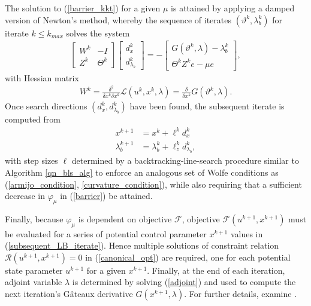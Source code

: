 The solution to (\ref{barrier_kkt}) for a given $\mu$ is attained by applying a damped version of  Newton's method, whereby the sequence of iterates $(\vartheta^k, \lambda_b^k)$ for iterate $k \leq k_{max}$ solves the system
\begin{align}
  \begin{bmatrix}
   W^k   & - I \\
   Z^k   &   \varTheta^k
  \end{bmatrix}
  \begin{bmatrix}
    d_{x}^k \\
    d_{\lambda_b}^k
  \end{bmatrix} = - 
  \begin{bmatrix}
    G(\vartheta^k,\lambda) - \lambda_b^k \\
    \varTheta^k Z^k e - \mu e
  \end{bmatrix},
\end{align}
with Hessian matrix 
\begin{align}
  W^k = \frac{\delta^2}{\delta x^k \delta x^k} \mathscr{L}(u^k, x^k, \lambda) = \frac{\delta}{\delta x^k} G(\vartheta^k,\lambda).
\end{align}
Once search directions $(d_{x}^k, d_{\lambda_b}^k)$ have been found, the subsequent iterate is computed from
\begin{align}
  \label{subsequent_LB_iterate}
  x^{k+1} &= x^k + \ell^k d_{x}^k \\
  \lambda_b^{k+1} &= \lambda_b^k + \ell_z^k d_{\lambda_b}^k,
\end{align}
with step sizes $\ell$ determined by a backtracking-line-search procedure similar to Algorithm \ref{qn_bls_alg} to enforce an analogous set of Wolfe conditions as (\ref{armijo_condition}, \ref{curvature_condition}), while also requiring that a sufficient decrease in $\varphi_{\mu}$ in (\ref{barrier}) be attained.

Finally, because $\varphi_{\mu}$ is dependent on objective $\mathscr{F}$, objective $\mathscr{F}(u^{k+1},x^{k+1})$ must be evaluated for a series of potential control parameter $x^{k+1}$ values in (\ref{subsequent_LB_iterate}).  Hence multiple solutions of constraint relation $\mathscr{R}(u^{k+1},x^{k+1}) = 0$ in (\ref{canonical_opt}) are required, one for each potential state parameter $u^{k+1}$ for a given $x^{k+1}$.  Finally, at the end of each iteration, adjoint variable $\lambda$ is determined by solving (\ref{adjoint}) and used to compute the next iteration's G\^{a}teaux derivative $G(x^{k+1}, \lambda)$.  For further details, examine \citet{waechter_2006}.

